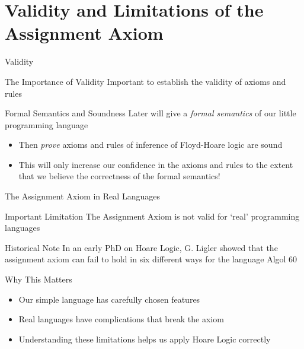 \section{Validity and Limitations of the Assignment Axiom}

\begin{frame}{Validity}
    \begin{block}{The Importance of Validity}
        Important to establish the validity of axioms and rules
    \end{block}
    
    \begin{block}{Formal Semantics and Soundness}
        Later will give a \emph{formal semantics} of our little programming language
        \begin{itemize}
            \item Then \emph{prove} axioms and rules of inference of Floyd-Hoare logic are sound
            \item This will only increase our confidence in the axioms and rules to the extent that we believe the correctness of the formal semantics!
        \end{itemize}
    \end{block}
\end{frame}

\begin{frame}{The Assignment Axiom in Real Languages}
    \begin{alertblock}{Important Limitation}
        The Assignment Axiom is not valid for `real' programming languages
    \end{alertblock}
    
    \begin{block}{Historical Note}
        In an early PhD on Hoare Logic, G. Ligler showed that the assignment axiom can fail to hold in six different ways for the language Algol 60
    \end{block}
    
    \begin{block}{Why This Matters}
        \begin{itemize}
            \item Our simple language has carefully chosen features
            \item Real languages have complications that break the axiom
            \item Understanding these limitations helps us apply Hoare Logic correctly
        \end{itemize}
    \end{block}
\end{frame}

